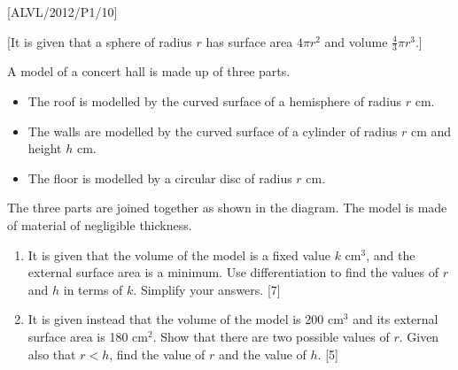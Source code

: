 \item {[}ALVL/2012/P1/10{]}

{[}It is given that a sphere of radius $r$ has surface area $4\pi r^{2}$
and volume $\frac{4}{3}\pi r^{3}$.{]} 

A model of a concert hall is made up of three parts. 
\begin{itemize}
\item The roof is modelled by the curved surface of a hemisphere of radius
$r$ cm. 
\item The walls are modelled by the curved surface of a cylinder of radius
$r$ cm and height $h$ cm. 
\item The floor is modelled by a circular disc of radius $r$ cm. 
\end{itemize}
The three parts are joined together as shown in the diagram. The model
is made of material of negligible thickness. 
\begin{enumerate}
\item It is given that the volume of the model is a fixed value $k$ cm$^{3}$,
and the external surface area is a minimum. Use differentiation to
find the values of $r$ and $h$ in terms of $k$. Simplify your answers.
\hfill{} {[}7{]}
\item It is given instead that the volume of the model is 200 cm$^{3}$
and its external surface area is 180 cm$^{2}$. Show that there are
two possible values of $r$. Given also that $r<h$, find the value
of $r$ and the value of $h$. \hfill{}{[}5{]}
\end{enumerate}

